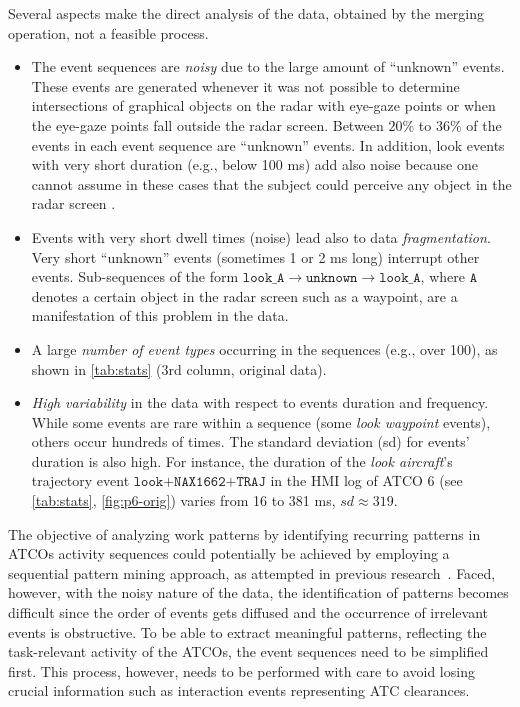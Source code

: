 \documentclass[camera]{vgtc}                          %
\begin{document}
Several aspects make the direct analysis of the data, obtained by the merging operation, not a feasible process.
\begin{itemize}
    \itemsep0em
    \vspace{-4pt} 
    \item The event sequences are \emph{noisy} due to the large amount of ``unknown'' events. These events are generated whenever it was not possible to determine 
    intersections of graphical objects on the radar with eye-gaze points or when the eye-gaze points fall outside the radar screen. Between $ 20\% $ to $ 36\% $ of the events in each event sequence are ``unknown'' events. 
    In addition, look events with very short duration (e.g., below 100 ms) add also noise because one cannot assume in these cases that the subject could perceive any object in the radar screen \cite{Miller1968Response}.
    \vspace{-4pt}
    \item Events with very short dwell times (noise) lead also to data \emph{fragmentation}. 
    Very short ``unknown'' events (sometimes 1 or 2 ms long) interrupt other events. 
    Sub-sequences of the form 
    $ \texttt{look\_A} \rightarrow \texttt{unknown} \rightarrow \texttt{look\_A} $, where $ \texttt{A} $ denotes a certain object in the radar screen such as a waypoint, are a manifestation of this problem in the data. 
    \vspace{-4pt}
    \item A large \emph{number of event types} occurring in the sequences (e.g., over 100), as shown in \autoref{tab:stats} (3rd column, original data).
    \vspace{-4pt}
    \item \emph{High variability} in the data with respect to events duration and frequency. While some events are rare within a sequence (some \textit{look waypoint} events), others occur hundreds of times. The standard deviation (sd) for events' duration is also high. For instance, the duration of the \textit{look aircraft}'s trajectory event $ \texttt{look+NAX1662+TRAJ} $ in the HMI log of ATCO 6 (see \autoref{tab:stats}, \autoref{fig:p6-orig}) varies from 16 to 381 ms, $sd \approx 319$.
\vspace{-4pt}
\end{itemize}

The objective of analyzing work patterns by identifying recurring patterns in ATCOs activity sequences could potentially be achieved by employing a sequential pattern mining approach, as attempted in previous research~\cite{westin2019visual}. Faced, however, with the noisy nature of the data, the identification of patterns becomes difficult since the order of events gets diffused and the occurrence of irrelevant events is obstructive. To be able to extract meaningful patterns, reflecting the task-relevant activity of the ATCOs, the event sequences need to be simplified first. This process, however, needs to be performed with care to avoid losing crucial information such as interaction events representing ATC clearances. 
\end{document}
